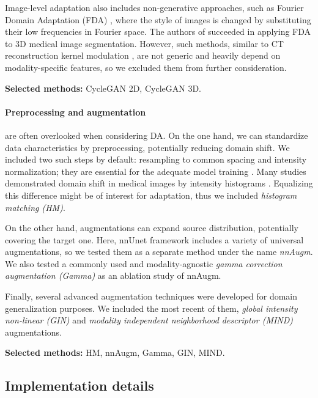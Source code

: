 Image-level adaptation also includes non-generative approaches, such as Fourier Domain Adaptation (FDA) \cite{fda}, where the style of images is changed by substituting their low frequencies in Fourier space. The authors of \cite{fda_medim} succeeded in applying FDA to 3D medical image segmentation. However, such methods, similar to CT reconstruction kernel modulation \cite{fbpaug}, are not generic and heavily depend on modality-specific features, so we excluded them from further consideration.

\textbf{Selected methods:} CycleGAN 2D, CycleGAN 3D.


\paragraph{Preprocessing and augmentation} are often overlooked when considering DA. On the one hand, we can standardize data characteristics by preprocessing, potentially reducing domain shift. We included two such steps by default: resampling to common spacing and intensity normalization; they are essential for the adequate model training \cite{kondrateva2024negligible}. Many studies demonstrated domain shift in medical images by intensity histograms \cite{crossmoda,se_medim,ihf}. Equalizing this difference might be of interest for adaptation, thus we included \textit{histogram matching (HM)}.

On the other hand, augmentations can expand source distribution, potentially covering the target one. Here, nnUnet framework \cite{nnunet} includes a variety of universal augmentations, so we tested them as a separate method under the name \textit{nnAugm}. We also tested a commonly used and modality-agnostic \textit{gamma correction augmentation (Gamma)} as an ablation study of nnAugm.

Finally, several advanced augmentation techniques were developed for domain generalization purposes. We included the most recent of them, \textit{global intensity non-linear (GIN)} \cite{gin} and \textit{modality independent neighborhood descriptor (MIND)} \cite{dg_tta} augmentations.

\textbf{Selected methods:} HM, nnAugm, Gamma, GIN, MIND.


\subsection{Implementation details}




